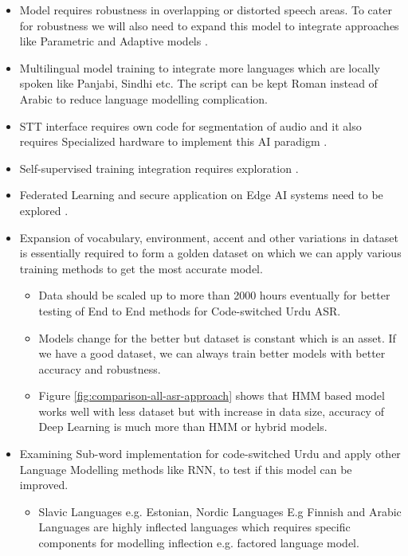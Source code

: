 \begin{itemize}
    \item Model requires robustness in overlapping or distorted speech areas. To cater for robustness we will also need to expand this model to integrate approaches like Parametric and Adaptive models \cite{shrawankar_adverse_2013}. 
    \item Multilingual model training to integrate more languages which are locally spoken like Panjabi, Sindhi etc. The script can be kept Roman instead of Arabic to reduce language modelling complication.
    \item STT interface requires own code for segmentation of audio and it also requires Specialized hardware to implement this AI paradigm \cite{alphacep_vosk_2022}.
    \item Self-supervised training integration requires exploration  \cite{yang_online_2022}.
    \item Federated Learning and secure application on Edge AI systems need to be explored \cite{noauthor_federated_nodate}.
    \item Expansion of vocabulary, environment, accent and other variations in dataset is essentially required to form a golden dataset on which we can apply various training methods to get the most accurate model. 
    \begin{itemize}
        \item Data should be scaled up to more than 2000 hours eventually for better testing of End to End methods for Code-switched Urdu ASR. 
        \item Models change for the better but dataset is constant which is an asset. If we have a good dataset, we can always train better models with better accuracy and robustness. 
        \item Figure \ref{fig:comparison-all-asr-approach} shows that HMM based model works well with less dataset but with increase in data size, accuracy of Deep Learning is much more than HMM or hybrid models.
    \end{itemize}
    \item Examining Sub-word implementation \cite{smit_advances_2021} for code-switched Urdu and apply other Language Modelling methods like RNN, to test if this model can be improved.
        \begin{itemize}
            \item Slavic Languages e.g. Estonian, Nordic Languages E.g Finnish and Arabic Languages are highly inflected languages which requires specific components for modelling inflection e.g. factored language model. 

\end{itemize}
\end{itemize}
